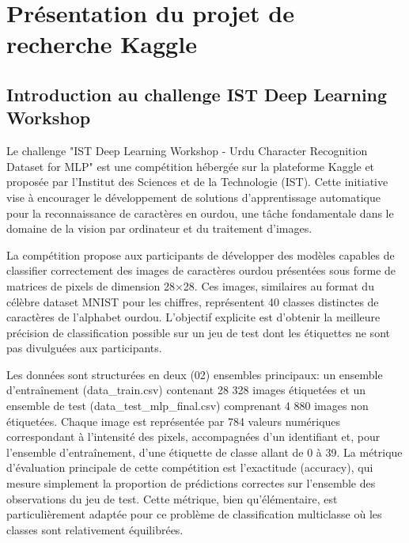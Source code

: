 
\chapter{Présentation du projet de recherche Kaggle}
\section{Introduction au challenge IST Deep Learning Workshop}


Le challenge "IST Deep Learning Workshop - Urdu Character Recognition Dataset for MLP" est une compétition hébergée sur la plateforme Kaggle et proposée par l'Institut des Sciences et de la Technologie (IST). Cette initiative vise à encourager le développement de solutions d'apprentissage automatique pour la reconnaissance de caractères en ourdou, une tâche fondamentale dans le domaine de la vision par ordinateur et du traitement d'images.

La compétition propose aux participants de développer des modèles capables de classifier correctement des images de caractères ourdou présentées sous forme de matrices de pixels de dimension 28×28. Ces images, similaires au format du célèbre dataset MNIST pour les chiffres, représentent 40 classes distinctes de caractères de l'alphabet ourdou. L'objectif explicite est d'obtenir la meilleure précision de classification possible sur un jeu de test dont les étiquettes ne sont pas divulguées aux participants.

Les données sont structurées en deux (02) ensembles principaux: un ensemble d'entraînement  (data\_train.csv) contenant 28 328 images étiquetées et un ensemble de test (data\_test\_mlp\_final.csv) comprenant 4 880 images non étiquetées. Chaque image est représentée par 784 valeurs numériques correspondant à l'intensité des pixels, accompagnées d'un identifiant et, pour l'ensemble d'entraînement, d'une étiquette de classe allant de 0 à 39.
La métrique d'évaluation principale de cette compétition est l'exactitude (accuracy), qui mesure simplement la proportion de prédictions correctes sur l'ensemble des observations du jeu de test. Cette métrique, bien qu'élémentaire, est particulièrement adaptée pour ce problème de classification multiclasse où les classes sont relativement équilibrées.

